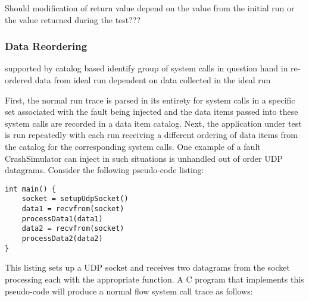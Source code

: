             Should modification of return value depend on the value from the initial run or the value returned during
            the test???

        \subsubsection{Data Reordering}

            supported by catalog based
            identify group of system calls in question
            hand in re-ordered data from ideal run
            dependent on data collected in the ideal run


            First, the normal run trace is parsed in its entirety for system calls in a specific set
            associated with the fault being injected and the data items passed into these system calls are recorded in a
            data item catalog. Next, the application under test is run repeatedly with each run receiving a different
            ordering of data items from the catalog for the corresponding system calls. One example of a fault
            CrashSimulator can inject in such situations is unhandled out of order UDP datagrams. Consider the following
            pseudo-code listing:

            \begin{verbatim}
int main() {
    socket = setupUdpSocket()
    data1 = recvfrom(socket)
    processData1(data1)
    data2 = recvfrom(socket)
    processData2(data2)
}
            \end{verbatim}

            This listing sets up a UDP socket and receives two datagrams from the socket processing each with the
            appropriate function. A C program that implements this pseudo-code will produce a normal flow system call trace
            as follows:

